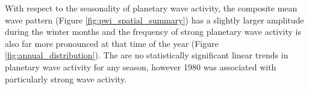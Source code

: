 With respect to the seasonality of planetary wave activity, the composite mean wave pattern (Figure \ref{fig:pwi_spatial_summary}) has a slightly larger amplitude during the winter months and the frequency of strong planetary wave activity is also far more pronounced at that time of the year (Figure \ref{fig:annual_distribution}). The are no statistically significant linear trends in planetary wave activity for any season, however 1980 was associated with particularly strong wave activity.
